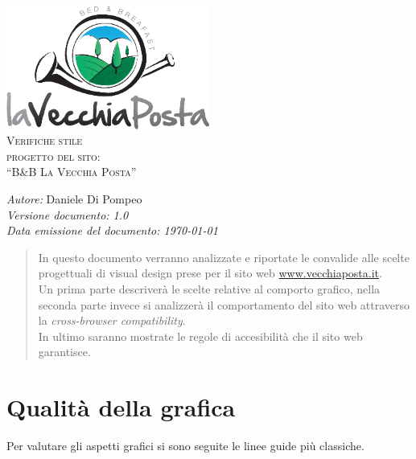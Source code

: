 \documentclass[a4paper,12pt,hidelinks]{report}
\begin{document}
  \begin{titlepage}
    \begin{center}
      \includegraphics[width=0.5\textwidth,keepaspectratio=true]{../img/logo}\\[1cm]    
      \textsc{\LARGE Verifiche stile}\\[0.6cm]
      \textsc{\LARGE  progetto del sito:\\[0.5cm] ``B\&B La Vecchia Posta''}\\ [2.0cm]

      \begin{minipage}{0.8\textwidth}
	\begin{flushleft} \large
	  \emph{Autore:} Daniele Di Pompeo \\[0.5cm]
	  \emph{Versione documento: 1.0}\\[0.5cm]
	  \emph{Data emissione del documento: \today}\\[0.5cm]
	\end{flushleft}
      \end{minipage}
    \end{center}
  \end{titlepage}

 
\begin{abstract}
In questo documento verranno analizzate e riportate le convalide alle scelte progettuali di visual design prese per il sito web \url{www.vecchiaposta.it}.
\\Un prima parte descriverà le scelte relative al comporto grafico, nella seconda parte invece si analizzerà il comportamento del sito web attraverso la 
\textit{cross-browser compatibility}.
\\In ultimo saranno mostrate le regole di accesibilità che il sito web garantisce.
\end{abstract}

\section*{Qualità della grafica}
Per valutare gli aspetti grafici si sono seguite le linee guide più classiche.
\end{document}
